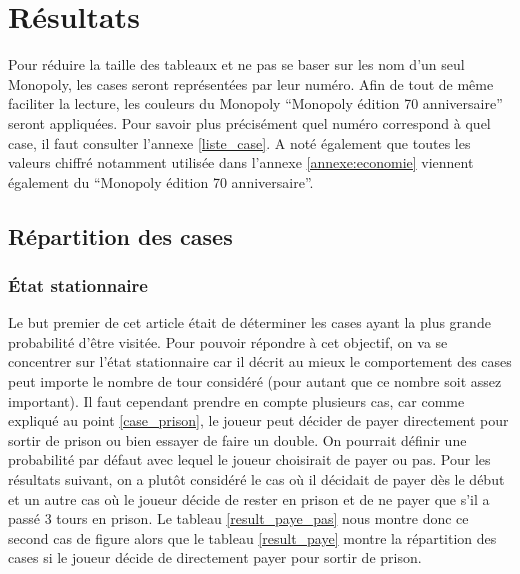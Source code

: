 \documentclass[letterpaper]{article}
\newcommand{\monopolyEditionAnni}{``Monopoly édition 70\up{ème} anniversaire''}
\begin{document}
\section{Résultats}
  Pour réduire la taille des tableaux et ne pas se baser sur les nom d'un seul
  Monopoly, les cases seront représentées par leur numéro.  Afin de tout de même 
  faciliter la lecture, les couleurs du Monopoly \monopolyEditionAnni
  seront appliquées.  Pour savoir plus précisément quel numéro
  correspond à quel case, il faut consulter l'annexe \ref{liste_case}.  A noté
  également que toutes les valeurs chiffré notamment utilisée dans l'annexe
  \ref{annexe:economie} viennent également du \monopolyEditionAnni.
  
  \subsection{Répartition des cases}
  
    \subsubsection{État stationnaire}
      Le but premier de cet article était de déterminer les cases ayant
      la plus grande probabilité d'être visitée.  Pour pouvoir répondre à 
      cet objectif, on va se concentrer sur l'état stationnaire car il décrit
      au mieux le comportement des cases peut importe le nombre de tour considéré
      (pour autant que ce nombre soit assez important).  Il faut cependant 
      prendre en compte plusieurs cas, car comme expliqué au point \ref{case_prison}, le
      joueur peut décider de payer directement pour sortir de prison ou bien
      essayer de faire un double.  On pourrait définir une probabilité par défaut
      avec lequel le joueur choisirait de payer ou pas.  Pour les résultats suivant,
      on a plutôt considéré le cas où il décidait de payer dès le début et un autre 
      cas où le joueur décide de rester en prison et de ne payer que s'il a passé
      3 tours en prison.  Le tableau \ref{result_paye_pas} nous montre donc ce second
      cas de figure alors que le tableau \ref{result_paye} montre la répartition 
      des cases si le joueur décide de directement payer pour sortir de prison.
    
\end{document}
